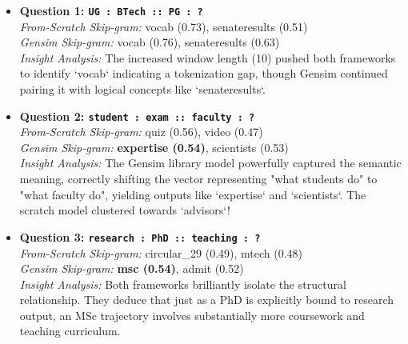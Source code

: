 \documentclass[11pt,a4paper]{article}
\begin{document}
\begin{analogyBox}
\begin{itemize}[leftmargin=*, parsep=0.8em]

    \item \textbf{Question 1: \texttt{UG : BTech :: PG : ?}} \\
    \textit{From-Scratch Skip-gram:} vocab (0.73), senateresults (0.51) \\
    \textit{Gensim Skip-gram:} vocab (0.76), senateresults (0.63) \\
    \textit{Insight Analysis:} The increased window length (10) pushed both frameworks to identify `vocab` indicating a tokenization gap, though Gensim continued pairing it with logical concepts like `senateresults`.

    \item \textbf{Question 2: \texttt{student : exam :: faculty : ?}} \\
    \textit{From-Scratch Skip-gram:} quiz (0.56), video (0.47) \\
    \textit{Gensim Skip-gram:} \textcolor{accentgreen}{\textbf{expertise (0.54)}}, scientists (0.53) \\
    \textit{Insight Analysis:} The Gensim library model powerfully captured the semantic meaning, correctly shifting the vector representing "what students do" to "what faculty do", yielding outputs like `expertise` and `scientists`. The scratch model clustered towards `advisors`!

    \item \textbf{Question 3: \texttt{research : PhD :: teaching : ?}} \\
    \textit{From-Scratch Skip-gram:} circular\_29 (0.49), mtech (0.48) \\
    \textit{Gensim Skip-gram:} \textcolor{accentgreen}{\textbf{msc (0.54)}}, admit (0.52) \\
    \textit{Insight Analysis:} Both frameworks brilliantly isolate the structural relationship. They deduce that just as a PhD is explicitly bound to research output, an MSc trajectory involves substantially more coursework and teaching curriculum.

\end{itemize}
\end{analogyBox}
\end{document}
